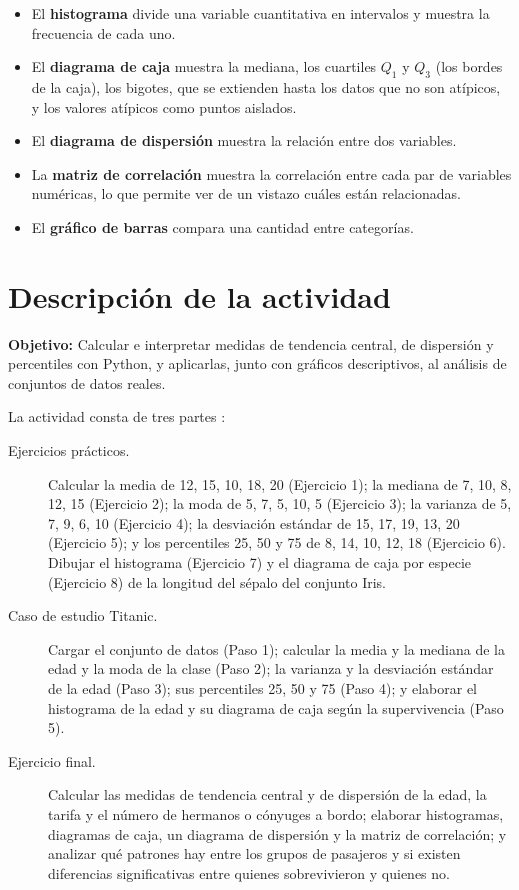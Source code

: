 \documentclass[11pt,letterpaper]{article}
\begin{document}
\begin{itemize}
    \item El \textbf{histograma} divide una variable cuantitativa en intervalos y muestra la frecuencia de cada uno.
    \item El \textbf{diagrama de caja} muestra la mediana, los cuartiles $Q_1$ y $Q_3$ (los bordes de la caja), los bigotes, que se extienden hasta los datos que no son atípicos, y los valores atípicos como puntos aislados.
    \item El \textbf{diagrama de dispersión} muestra la relación entre dos variables.
    \item La \textbf{matriz de correlación} muestra la correlación entre cada par de variables numéricas, lo que permite ver de un vistazo cuáles están relacionadas.
    \item El \textbf{gráfico de barras} compara una cantidad entre categorías.
\end{itemize}

\section{Descripción de la actividad}

\textbf{Objetivo:} Calcular e interpretar medidas de tendencia central, de dispersión y percentiles con Python, y aplicarlas, junto con gráficos descriptivos, al análisis de conjuntos de datos reales.

La actividad consta de tres partes \parencite{tecnm2026_documento_fuente}:

\begin{description}
    \item[Ejercicios prácticos.] Calcular la media de 12, 15, 10, 18, 20 (Ejercicio 1); la mediana de 7, 10, 8, 12, 15 (Ejercicio 2); la moda de 5, 7, 5, 10, 5 (Ejercicio 3); la varianza de 5, 7, 9, 6, 10 (Ejercicio 4); la desviación estándar de 15, 17, 19, 13, 20 (Ejercicio 5); y los percentiles 25, 50 y 75 de 8, 14, 10, 12, 18 (Ejercicio 6). Dibujar el histograma (Ejercicio 7) y el diagrama de caja por especie (Ejercicio 8) de la longitud del sépalo del conjunto Iris.
    \item[Caso de estudio Titanic.] Cargar el conjunto de datos (Paso 1); calcular la media y la mediana de la edad y la moda de la clase (Paso 2); la varianza y la desviación estándar de la edad (Paso 3); sus percentiles 25, 50 y 75 (Paso 4); y elaborar el histograma de la edad y su diagrama de caja según la supervivencia (Paso 5).
    \item[Ejercicio final.] Calcular las medidas de tendencia central y de dispersión de la edad, la tarifa y el número de hermanos o cónyuges a bordo; elaborar histogramas, diagramas de caja, un diagrama de dispersión y la matriz de correlación; y analizar qué patrones hay entre los grupos de pasajeros y si existen diferencias significativas entre quienes sobrevivieron y quienes no.
\end{description}
\end{document}
